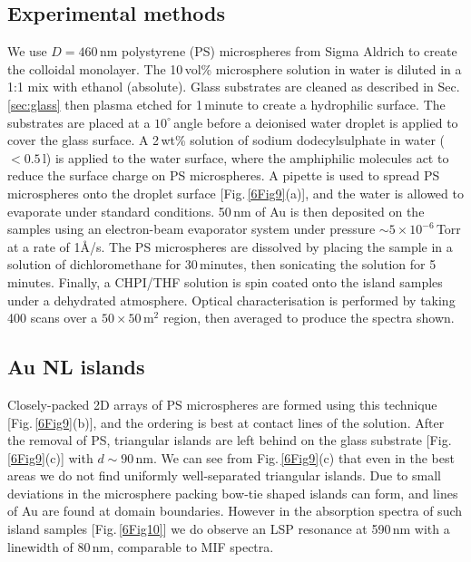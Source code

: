\subsection{Experimental methods}
We use $D=460$\,nm polystyrene (PS) microspheres from Sigma Aldrich to create the colloidal monolayer. The 10\,vol\% microsphere solution in water is diluted in a 1:1 mix with ethanol (absolute). Glass substrates are cleaned as described in Sec.\,\ref{sec:glass} then plasma etched for 1\,minute to create a hydrophilic surface. The substrates are placed at a $10^{\circ}$\,angle before a deionised water droplet is applied to cover the glass surface. A 2\,wt\% solution of sodium dodecylsulphate in water ($<0.5\,$\textmu l) is applied to the water surface, where the amphiphilic molecules act to reduce the surface charge on PS microspheres. A pipette is used to spread PS microspheres onto the droplet surface [Fig.\,\ref{6Fig9}(a)], and the water is allowed to evaporate under standard conditions. 50\,nm of Au is then deposited on the samples using an electron-beam evaporator system under pressure $\sim5\times10^{-6}$\,Torr at a rate of 1\AA/s. The PS microspheres are dissolved by placing the sample in a solution of dichloromethane for 30\,minutes, then sonicating the solution for 5\,minutes. Finally, a CHPI/THF solution is spin coated onto the island samples under a dehydrated atmosphere. Optical characterisation is performed by taking 400 scans over a $50\times50\,$\textmu m$^{2}$ region, then averaged to produce the spectra shown. 

\subsection{Au NL islands}
Closely-packed 2D arrays of PS microspheres are formed using this technique [Fig.\,\ref{6Fig9}(b)], and the ordering is best at contact lines of the solution. After the removal of PS, triangular islands are left behind on the glass substrate [Fig.\,\ref{6Fig9}(c)] with $d\sim90$\,nm. We can see from Fig.\,\ref{6Fig9}(c) that even in the best areas we do not find uniformly well-separated triangular islands. Due to small deviations in the microsphere packing bow-tie shaped islands can form, and lines of Au are found at domain boundaries. However in the absorption spectra of such island samples [Fig.\,\ref{6Fig10}] we do observe an LSP resonance at 590\,nm with a linewidth of 80\,nm, comparable to MIF spectra.

